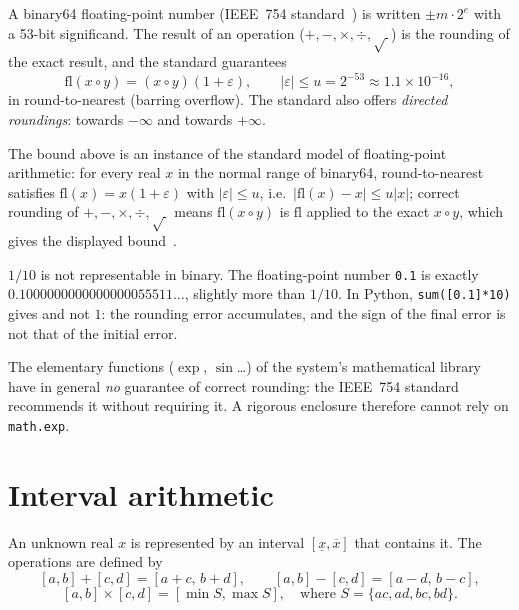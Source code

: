 A binary64 floating-point number (IEEE~754 standard~\cite{app:ieee754}) is written $\pm m\cdot2^{e}$ with a 53-bit
significand. The result of an operation ($+,-,\times,\div,\sqrt{\ }$) is the rounding of the exact result, and the
standard guarantees
\[\mathrm{fl}(x\circ y)=(x\circ y)(1+\varepsilon),\qquad|\varepsilon|\le u=2^{-53}\approx1.1\times10^{-16},\]
in round-to-nearest (barring overflow). The standard also offers \emph{directed roundings}: towards
$-\infty$ and towards $+\infty$.

\begin{uniremark}\tierL{} The bound above is an instance of the standard model of floating-point arithmetic: for every
real $x$ in the normal range of binary64, round-to-nearest satisfies $\mathrm{fl}(x)=x(1+\varepsilon)$ with
$|\varepsilon|\le u$, i.e.\ $|\mathrm{fl}(x)-x|\le u|x|$; correct rounding of $+,-,\times,\div,\sqrt{\ }$ means
$\mathrm{fl}(x\circ y)$ is $\mathrm{fl}$ applied to the exact $x\circ y$, which gives the displayed bound~\cite{app:ieee754}.
\end{uniremark}

\begin{example}
$1/10$ is not representable in binary. The floating-point number \texttt{0.1} is exactly
$0.1000000000000000055511\ldots$, slightly more than $1/10$. In Python, \texttt{sum([0.1]*10)} gives
 and not $1$: the rounding error accumulates, and the sign of the final error is not that
of the initial error.
\end{example}

The elementary functions ($\exp$, $\sin$\ldots) of the system's mathematical library have in general \emph{no}
guarantee of correct rounding: the IEEE~754 standard recommends it without requiring it. A rigorous enclosure therefore
cannot rely on \texttt{math.exp}.

\section{Interval arithmetic}\label{appD:sec:intervalles}

\begin{definition}
An unknown real $x$ is represented by an interval $[\underline x,\overline x]$ that contains it. The operations are
defined by
\[[a,b]+[c,d]=[a+c,\,b+d],\qquad[a,b]-[c,d]=[a-d,\,b-c],\]
\[[a,b]\times[c,d]=[\min S,\max S],\quad\text{where }S=\{ac,ad,bc,bd\}.\]
\end{definition}

